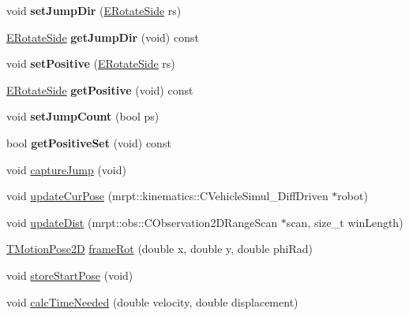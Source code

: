 \begin{DoxyCompactItemize}
\mbox{\label{classmotion_1_1CActionBase_af2c6d7fc26e2bf35184eb8062b121522}} 
void {\bfseries set\+Jump\+Dir} (\mbox{\hyperlink{motionEnums_8h_a03a5344cd29a761a4b7dcaf1df3c3c85}{E\+Rotate\+Side}} rs)
\item 
\mbox{\label{classmotion_1_1CActionBase_a44b1d1fa8bedfa59916d9c4c31b22117}} 
\mbox{\hyperlink{motionEnums_8h_a03a5344cd29a761a4b7dcaf1df3c3c85}{E\+Rotate\+Side}} {\bfseries get\+Jump\+Dir} (void) const
\item 
\mbox{\label{classmotion_1_1CActionBase_a1a90c80a9029798aac8b2fd388d8f784}} 
void {\bfseries set\+Positive} (\mbox{\hyperlink{motionEnums_8h_a03a5344cd29a761a4b7dcaf1df3c3c85}{E\+Rotate\+Side}} rs)
\item 
\mbox{\label{classmotion_1_1CActionBase_a5c84487dba7d2996e9d35376b7a45c79}} 
\mbox{\hyperlink{motionEnums_8h_a03a5344cd29a761a4b7dcaf1df3c3c85}{E\+Rotate\+Side}} {\bfseries get\+Positive} (void) const
\item 
\mbox{\label{classmotion_1_1CActionBase_a595c2b53e4daf353c7855302f626c694}} 
void {\bfseries set\+Jump\+Count} (bool ps)
\item 
\mbox{\label{classmotion_1_1CActionBase_adb60bce8bcb7410ba5596906d64490b0}} 
bool {\bfseries get\+Positive\+Set} (void) const
\item 
void \mbox{\hyperlink{classmotion_1_1CActionBase_a48d2c07fa908bf6ed57e3219a017b25e}{capture\+Jump}} (void)
\item 
void \mbox{\hyperlink{classmotion_1_1CActionBase_a5fd00b2fca445758e6cbf4d5a92a5082}{update\+Cur\+Pose}} (mrpt\+::kinematics\+::\+C\+Vehicle\+Simul\+\_\+\+Diff\+Driven $\ast$robot)
\item 
void \mbox{\hyperlink{classmotion_1_1CActionBase_ac7706bd708dc987b1da17bfa6d33a70c}{update\+Dist}} (mrpt\+::obs\+::\+C\+Observation2\+D\+Range\+Scan $\ast$scan, size\+\_\+t win\+Length)
\item 
\mbox{\hyperlink{structmotion_1_1TMotionPose2D}{T\+Motion\+Pose2D}} \mbox{\hyperlink{classmotion_1_1CActionBase_aef651b6dae673bb2eba9245aa509c40d}{frame\+Rot}} (double x, double y, double phi\+Rad)
\item 
void \mbox{\hyperlink{classmotion_1_1CActionBase_af660bbf31c33b1932a1a5b9219334211}{store\+Start\+Pose}} (void)
\item 
void \mbox{\hyperlink{classmotion_1_1CActionBase_a90058a23162d40496c60ed44578c2f69}{calc\+Time\+Needed}} (double velocity, double displacement)
\end{DoxyCompactItemize}


